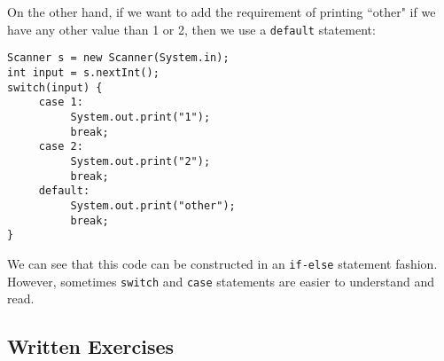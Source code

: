 \\ \\
On the other hand, if we want to add the requirement of printing ``other" if we have any other value than 1 or 2, then we use a \verb|default| statement:
\begin{lstlisting}
Scanner s = new Scanner(System.in);
int input = s.nextInt();
switch(input) {
     case 1:
          System.out.print("1");
          break;
     case 2:
          System.out.print("2");
          break;
     default:
          System.out.print("other");
          break;
}
\end{lstlisting}
We can see that this code can be constructed in an \verb|if-else| statement fashion. However, sometimes \verb|switch| and \verb|case| statements are easier to understand and read.

\subsection{Written Exercises}

